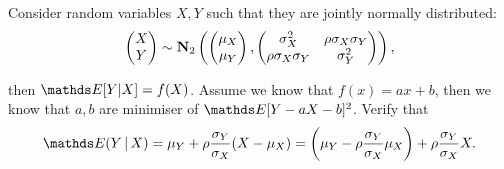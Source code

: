 \begin{exercise} Consider random variables $X,Y$ such that they are jointly normally distributed:
\begin{equation}
    \begin{pmatrix} X \\ Y\end{pmatrix} \sim \mathbf{N}_{2} \left(  \begin{pmatrix} \mu_X \\ \mu_Y \end{pmatrix}, \begin{pmatrix} \sigma_X^2 & \rho \sigma_X \sigma_Y \\ \rho \sigma_X \sigma_Y & \sigma_Y^2 \end{pmatrix} \right),
\end{equation}

then $\E[Y|X] = f(X)$. Assume we know that $f(x) = ax+b$, then we know that $a,b$ are minimiser of $\E[Y - aX - b]^2$. Verify that
\begin{equation}
    \E(Y\,|\,X) = \mu_Y + \rho \frac{\sigma_Y}{\sigma_X}(X - \mu_X) = \bracket{\mu_Y - \rho \frac{\sigma_Y}{\sigma_X}\mu_X} + \rho \frac{\sigma_Y}{\sigma_X} X.
\end{equation}
\end{exercise}
\newpage

